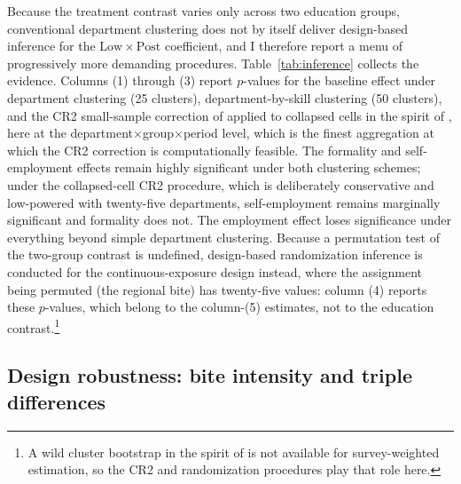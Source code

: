 Because the treatment contrast varies only across two education groups, conventional
department clustering does not by itself deliver design-based inference for the
$\mathrm{Low}\times\mathrm{Post}$ coefficient, and I therefore report a menu of
progressively more demanding procedures. Table~\ref{tab:inference} collects the
evidence. Columns (1) through (3) report $p$-values for the baseline effect under
department clustering (25 clusters), department-by-skill clustering (50 clusters), and
the CR2 small-sample correction of \citet{pustejovsky_tipton_2018} applied to
collapsed cells in the spirit of \citet{bertrand_2004}, here at the
department$\times$group$\times$period level, which is the finest aggregation at which
the CR2 correction is computationally feasible.
The formality and self-employment effects remain highly significant under both
clustering schemes; under the collapsed-cell CR2 procedure, which is deliberately
conservative and low-powered with twenty-five departments, self-employment remains
marginally significant and formality does not. The employment effect loses significance
under everything beyond simple department clustering. Because a permutation test of the
two-group contrast is undefined, design-based randomization inference is conducted for
the continuous-exposure design instead, where the assignment being permuted (the
regional bite) has twenty-five values: column (4) reports these $p$-values, which
belong to the column-(5) estimates, not to the education contrast.\footnote{A wild
cluster bootstrap in the spirit of \citet{cameron_2008_bootstrap} is not available
for survey-weighted estimation, so the CR2 and randomization procedures play that
role here.}



\subsection{Design robustness: bite intensity and triple differences}

